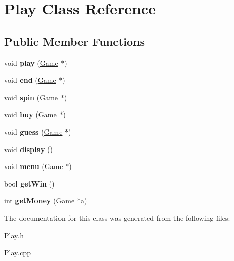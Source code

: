 \hypertarget{class_play}{}\section{Play Class Reference}
\label{class_play}
\subsection*{Public Member Functions}
\begin{DoxyCompactItemize}
\item 
\hypertarget{class_play_a0b4498cdd62a8eebeb10234185e3409d}{}\label{class_play_a0b4498cdd62a8eebeb10234185e3409d} 
void {\bfseries play} (\hyperlink{class_game}{Game} $\ast$)
\item 
\hypertarget{class_play_a7393a0885cbb8d087d657eb430ae5949}{}\label{class_play_a7393a0885cbb8d087d657eb430ae5949} 
void {\bfseries end} (\hyperlink{class_game}{Game} $\ast$)
\item 
\hypertarget{class_play_ae24e22ff4f1c68ae38f987ab066af7bb}{}\label{class_play_ae24e22ff4f1c68ae38f987ab066af7bb} 
void {\bfseries spin} (\hyperlink{class_game}{Game} $\ast$)
\item 
\hypertarget{class_play_ae353cd9ddff43a03f5c7d1f29d99dd57}{}\label{class_play_ae353cd9ddff43a03f5c7d1f29d99dd57} 
void {\bfseries buy} (\hyperlink{class_game}{Game} $\ast$)
\item 
\hypertarget{class_play_a56e8356e639427c516bc83761818ca77}{}\label{class_play_a56e8356e639427c516bc83761818ca77} 
void {\bfseries guess} (\hyperlink{class_game}{Game} $\ast$)
\item 
\hypertarget{class_play_ae9d057ab4c97d7d676ea365ee910cde3}{}\label{class_play_ae9d057ab4c97d7d676ea365ee910cde3} 
void {\bfseries display} ()
\item 
\hypertarget{class_play_a6af79117e524b01d8aa77ad6b3a75c6d}{}\label{class_play_a6af79117e524b01d8aa77ad6b3a75c6d} 
void {\bfseries menu} (\hyperlink{class_game}{Game} $\ast$)
\item 
\hypertarget{class_play_ac8244da334ad843bffa229010b909ad3}{}\label{class_play_ac8244da334ad843bffa229010b909ad3} 
bool {\bfseries get\+Win} ()
\item 
\hypertarget{class_play_a996f01a55184ef4f63c9e54b742d18ad}{}\label{class_play_a996f01a55184ef4f63c9e54b742d18ad} 
int {\bfseries get\+Money} (\hyperlink{class_game}{Game} $\ast$a)
\end{DoxyCompactItemize}


The documentation for this class was generated from the following files\+:\begin{DoxyCompactItemize}
\item 
Play.\+h\item 
Play.\+cpp\end{DoxyCompactItemize}
